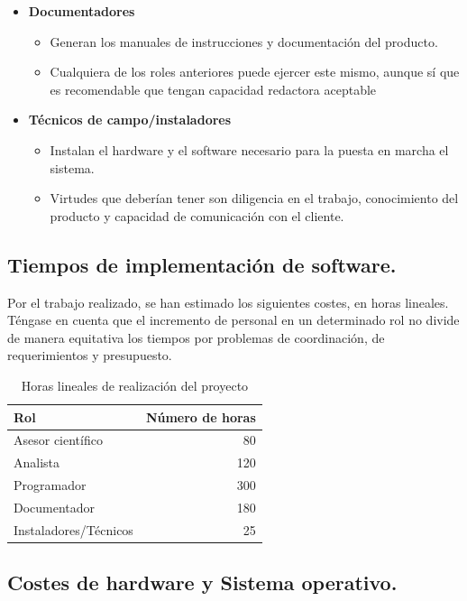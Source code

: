 \begin{itemize}
	\item{\textbf{Documentadores}
		\begin{itemize}
			\item{Generan los manuales de instrucciones y documentación del producto.}
			\item{Cualquiera de los roles anteriores puede ejercer este mismo, aunque sí que es recomendable que tengan capacidad redactora aceptable}
		\end{itemize}}

	\item{\textbf{Técnicos de campo/instaladores}
		\begin{itemize}
			\item{Instalan el hardware y el software necesario para la puesta en marcha el sistema.}
			\item{Virtudes que deberían tener son diligencia en el trabajo, conocimiento del producto y capacidad de comunicación con el cliente.}
		\end{itemize}}

\end{itemize}

\subsection{Tiempos de implementación de software.}
Por el trabajo realizado, se han estimado los siguientes costes, en horas lineales. Téngase en cuenta que el incremento de personal en un determinado rol no divide de manera equitativa los tiempos por problemas de coordinación, de requerimientos y presupuesto.

\begin{table}[!hbt]
	\centering
	\begin{tabular}{|l|r|}
		\hline
		\textbf{Rol} & \textbf{Número de horas} \\
		\hline \hline	
		Asesor científico & 80 \\ \hline
		Analista & 120 \\ \hline
		Programador & 300 \\ \hline 
		Documentador & 180 \\ \hline
		Instaladores/Técnicos & 25 \\ \hline
	\end{tabular}
	\caption{Horas lineales de realización del proyecto}
	\label{tab:project_hours}
\end{table}

\subsection{Costes de hardware y Sistema operativo.}

